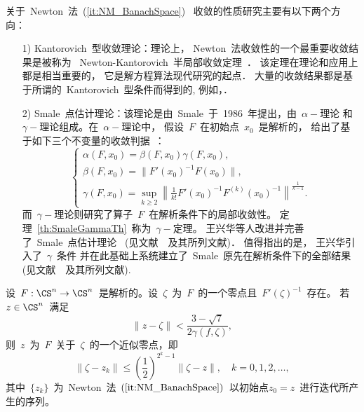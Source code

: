 关于~Newton~法~(\ref{it:NM_BanachSpace})~
收敛的性质研究主要有以下两个方向：
\begin{itemize}
\item[1)]
Kantorovich~型收敛理论：理论上，
Newton~法收敛性的一个最重要收敛结果是被称为
~Newton-Kantorovich~半局部收敛定理~\cite{Kantorvich1982}．
该定理在理论和应用上都是相当重要的， 它是解方程算法现代研究的起点．
大量的收敛结果都是基于所谓的~Kantorovich~型条件而得到的,
例如，\cite{Ortega1970,Rokne1972,Rall1974,GraggTapia1974,Deuflhard1979,
Ypma1982,Huang1993,Gutierrez1997a,Wang1999,Gutierrez2000,Ezquerro2002}．

\item[2)]
Smale~点估计理论：该理论是由~Smale~于~1986~年提出，由~$\alpha-$理论
和~$\gamma-$理论组成。在~$\alpha-$理论中，
假设~$F$~在初始点~$x_0$~是解析的，
给出了基于如下三个不变量的收敛判据~\cite{Smale1986}：
\begin{equation*}
\begin{cases}
\alpha(F,x_0) = \beta(F,x_0)\gamma(F,x_0),\\
\beta(F,x_0) = \|F'(x_0)^{-1}F(x_0)\|,\\
\gamma(F,x_0) = \sup\limits_{k \geqslant 2} \left\|\displaystyle
\frac{1}{k!} F'(x_0)^{-1}F^{(k)}(x_0)^{-1}\right\|^{\frac{1}{k-1}}.
\end{cases}
\end{equation*}
而~$\gamma-$理论则研究了算子~$F$~在解析条件下的局部收敛性。
定理~\ref{th:SmaleGammaTh}~称为~$\gamma-$定理。
王兴华等人改进并完善了~Smale~点估计理论
~(见文献~\cite{WangLi2001}~及其所列文献)． 值得指出的是，
王兴华引入了~$\gamma$~条件
并在此基础上系统建立了~Smale~原先在解析条件下的全部结果
(见文献~\cite{WangHan1997b}~及其所列文献).
\end{itemize}

\begin{theorem}
\label{th:SmaleGammaTh} 设~$F: \CS^n \to
\CS^n$~是解析的。设~$\zeta$~为~$F$~的一个零点且~$F'(\zeta)^{-1}$~存在。
若~$z \in \CS^n$~满足
\begin{equation}
\label{radius:gamma_AZ} \|z - \zeta\| < \frac{3-\sqrt{7}}{2
\gamma(f,\zeta)},
\end{equation}
则~$z$~为~$F$~关于~$\zeta$~的一个近似零点，即
\begin{equation}
\label{ApproximateZero} \|\zeta - z_k\| \leq
\left(\frac{1}{2}\right)^{2^{k} - 1} \|\zeta - z\|, \quad k = 0, 1,
2, \ldots,
\end{equation}
其中~$\{z_k\}$~为~Newton~法~$(\ref{it:NM_BanachSpace})$~以初始点$z_0
= z$~进行迭代所产生的序列。
\end{theorem}

